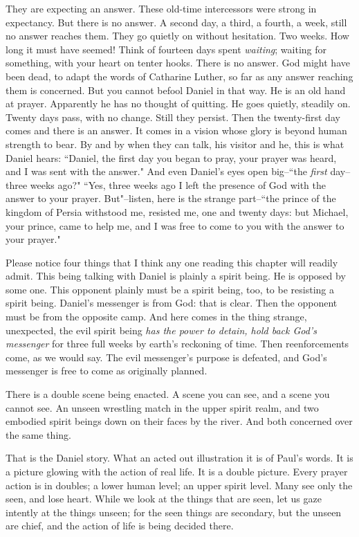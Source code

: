 They are expecting an answer. These old-time intercessors were strong in
expectancy. But there is no answer. A second day, a third, a fourth, a
week, still no answer reaches them. They go quietly on without hesitation.
Two weeks. How long it must have seemed! Think of fourteen days spent
\textit{waiting}; waiting for something, with your heart on tenter hooks. There
is no answer. God might have been dead, to adapt the words of Catharine
Luther, so far as any answer reaching them is concerned. But you cannot
befool Daniel in that way. He is an old hand at prayer. Apparently he has
no thought of quitting. He goes quietly, steadily on. Twenty days pass,
with no change. Still they persist. Then the twenty-first day comes and
there is an answer. It comes in a vision whose glory is beyond human
strength to bear. By and by when they can talk, his visitor and he, this
is what Daniel hears: ``Daniel, the first day you began to pray, your
prayer was heard, and I was sent with the answer." And even Daniel's eyes
open big--``the \textit{first} day--three weeks ago?" ``Yes, three weeks ago I left
the presence of God with the answer to your prayer. But"--listen, here is
the strange part--``the prince of the kingdom of Persia withstood me,
resisted me, one and twenty days: but Michael, your prince, came to help
me, and I was free to come to you with the answer to your prayer."

Please notice four things that I think any one reading this chapter will
readily admit. This being talking with Daniel is plainly a spirit being.
He is opposed by some one. This opponent plainly must be a spirit being,
too, to be resisting a spirit being. Daniel's messenger is from God: that
is clear. Then the opponent must be from the opposite camp. And here comes
in the thing strange, unexpected, the evil spirit being \textit{has the power to
detain, hold back God's messenger} for three full weeks by earth's
reckoning of time. Then reenforcements come, as we would say. The evil
messenger's purpose is defeated, and God's messenger is free to come as
originally planned.

There is a double scene being enacted. A scene you can see, and a scene
you cannot see. An unseen wrestling match in the upper spirit realm, and
two embodied spirit beings down on their faces by the river. And both
concerned over the same thing.

That is the Daniel story. What an acted out illustration it is of Paul's
words. It is a picture glowing with the action of real life. It is a
double picture. Every prayer action is in doubles; a lower human level; an
upper spirit level. Many see only the seen, and lose heart. While we look
at the things that are seen, let us gaze intently at the things unseen;
for the seen things are secondary, but the unseen are chief, and the
action of life is being decided there.

